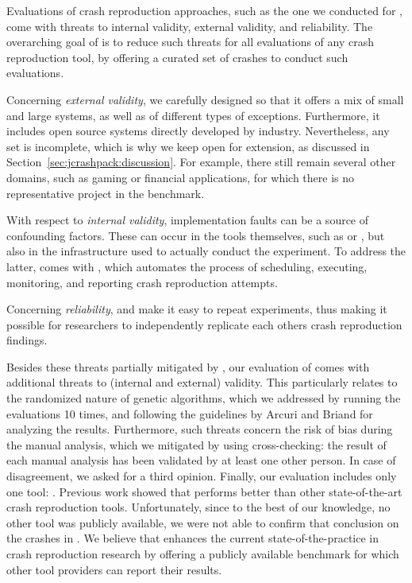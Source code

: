 
Evaluations of crash reproduction approaches, such as the one we conducted for \evocrash, come with threats to internal validity, external validity, and reliability.
The overarching goal of \crashpack is to reduce such threats for all evaluations of any crash reproduction tool, by offering a curated set of crashes to conduct such evaluations.

Concerning \emph{external validity}, we carefully designed \crashpack so that it offers a mix of small and large systems, as well as of different types of exceptions. Furthermore, it includes open source systems directly developed by industry.
%
Nevertheless, any set is incomplete, which is why we keep \crashpack open for extension, as discussed in Section~\ref{sec:jcrashpack:discussion}.  For example, there still remain several other domains, such as gaming or financial applications, for which there is no representative project in the benchmark. 

With respect to \emph{internal validity}, implementation faults can be a source of confounding factors. These can occur in the tools themselves, such as \evocrash or \evosuite, but also in the infrastructure used to actually conduct the experiment. To address the latter, \crashpack comes with \exrunner, which automates the process of scheduling, executing, monitoring, and reporting crash reproduction attempts.

Concerning \emph{reliability}, \crashpack and \exrunner make it easy to repeat experiments, thus making it possible for researchers to independently replicate each others crash reproduction findings.

Besides these threats partially mitigated by \crashpack, our evaluation of \evocrash comes with additional threats to (internal and external) validity. This particularly relates to the randomized nature of genetic algorithms, which we addressed by running the evaluations 10 times, and following the guidelines by Arcuri and Briand \cite{Arcuri2014} for analyzing the results. 
%
Furthermore, such threats concern the risk of bias during the manual analysis, which we mitigated by using cross-checking: the result of each manual analysis has been validated by at least one other person. 
In case of disagreement, we asked for a third opinion.
%
Finally, our evaluation includes only one tool: \evocrash. Previous work showed that \evocrash performs better than other state-of-the-art crash reproduction tools. 
Unfortunately, since to the best of our knowledge, no other tool was publicly available, we were not able to confirm that conclusion on the crashes in \crashpack. 
We believe that \crashpack enhances the current state-of-the-practice in crash reproduction research by offering a publicly available benchmark for which other tool providers can report their results. 


